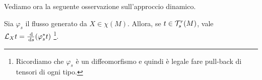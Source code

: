Vediamo ora la seguente osservazione sull'approccio dinamico.
\begin{remark}
	Sia $\varphi_s$ il flusso generato da $X\in\chi(M)$. Allora, se $t\in\mathcal T_s^r(M)$, vale $\mathcal L_Xt = \frac{\,\mathrm d}{\,\mathrm d s} (\varphi_s^* t)$ \footnote{Ricordiamo che $\varphi_s$ è un diffeomorfismo e quindi è legale fare pull-back di tensori di ogni tipo.}. %
\end{remark}